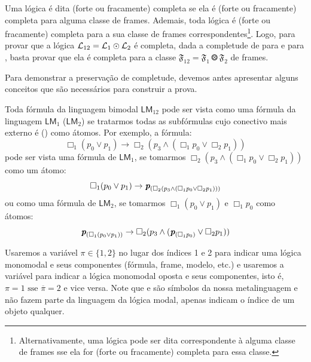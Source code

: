 
            Uma lógica é dita (forte ou fracamente) completa se ela é (forte ou fracamente) completa para alguma classe de frames. Ademais, toda lógica é (forte ou fracamente)
            completa para a sua classe de frames correspondentes\footnote{Alternativamente, uma lógica pode ser dita correspondente à alguma classe de frames sse ela
            for (forte ou fracamente) completa para essa classe.}. Logo, para provar que a lógica \(\mathcal{L}_{12} = \mathcal{L}_{1} \mathbin{\odot} \mathcal{L}_{2}\) é completa,
            dada a completude de  para  e  para , basta provar que ela é completa para a classe
            \(\mathfrak{F}_{12} = \mathfrak{F}_1 \Otimes \mathfrak{F}_2\) de frames.

            Para demonstrar a preservação de completude, devemos antes apresentar alguns conceitos que são necessários para construir a prova.

            Toda fórmula da linguagem bimodal \(\mathsf{LM}_{12}\) pode ser vista como uma fórmula da linguagem \(\mathsf{LM}_1\) (\(\mathsf{LM}_2\))
            se tratarmos todas as subfórmulas cujo conectivo mais externo é () como átomos. Por exemplo, a fórmula:
            \[
                \Box_1 (p_0 \lor p_1) \to \Box_2 (p_3 \land (\Box_1 p_0 \lor \Box_2 p_1))
            \]
            pode ser vista uma fórmula de \(\mathsf{LM}_1\), se tomarmos \(\Box_2 (p_3 \land (\Box_1 p_0 \lor \Box_2 p_1))\) como um átomo:
            \[
                \Box_1 (p_0 \lor p_1) \to \textit{\textbf{p}}_{\left(\Box_2 (p_3 \land (\Box_1 p_0 \lor \Box_2 p_1))\right)}
            \]
            ou como uma fórmula de \(\mathsf{LM}_2\), se tomarmos \(\Box_1(p_0 \lor p_1)\) e \(\Box_1 p_0\) como átomos:
            \[
                \textit{\textbf{p}}_{\left(\Box_1 (p_0 \lor p_1)\right)} \to \Box_2 (p_3 \land (\textit{\textbf{p}}_{\left(\Box_1 p_0\right)} \lor \Box_2 p_1))
            \]

            Usaremos a variável \(\pi \in \{1,2\}\) no lugar dos índices 1 e 2 para indicar uma lógica monomodal e seus componentes (fórmula, frame, modelo, etc.)
            e usaremos a variável \OPI para indicar a lógica monomodal oposta e seus componentes, isto é, \(\pi = 1 \text{ sse } \overline{\pi} = 2\) e vice versa.
            Note que \PI e \OPI são símbolos da nossa metalinguagem e não fazem parte da linguagem da lógica modal, apenas indicam o índice de um objeto qualquer.

